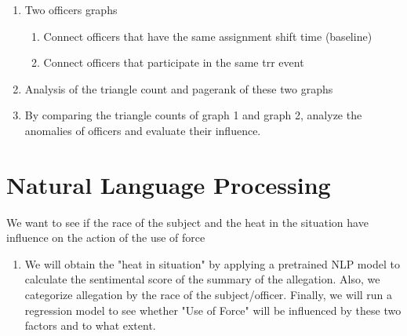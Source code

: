 \documentclass[10pt]{article}
\begin{document}
\begin{enumerate}

\item Two officers graphs
    \begin{enumerate}
    \item Connect officers that have the same assignment shift time (baseline)
    \item Connect officers that participate in the same trr event
    \end{enumerate}
\item Analysis of the triangle count and pagerank of these two graphs

\item By comparing the triangle counts of graph 1 and graph 2, analyze the anomalies of officers and evaluate their influence.

\end{enumerate}



\section{Natural Language Processing}

We want to see if the race of the subject and the heat in the situation have influence on the action of the use of force

\begin{enumerate}

\item We will obtain the "heat in situation" by applying a pretrained NLP model to calculate the sentimental score of the summary of the allegation. Also, we categorize allegation by the race of the subject/officer. Finally, we will run a regression model to see whether "Use of Force" will be influenced by these two factors and to what extent.

\end{enumerate}
\end{document}
